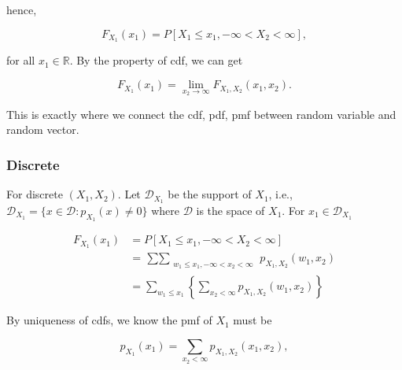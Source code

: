 \documentclass{article}
\begin{document}
            hence,

            \begin{equation*}
                F_{X_{1}}(x_{1}) = P[ X_{1} \leq x_{1}, -\infty < X_{2} < \infty ],
            \end{equation*}

            for all $ x_{1} \in \mathbb{R} $. By the property of cdf, we can get

            \begin{equation*}
                 F_{X_{1}}(x_{1}) = \lim_{x_{2} \rightarrow \infty} F_{X_{1}, X_{2}} (x_{1}, x_{2}).
            \end{equation*}

            This is exactly where we connect the cdf, pdf, pmf between random
            variable and random vector.

            \subsubsection{Discrete}

                For discrete $ (X_{1}, X_{2}) $. Let $ \mathcal{D}_{X_{1}} $ be the support of $ X_{1} $, i.e.,
                $ \mathcal{D}_{X_{1}} = \{ x \in \mathcal{D} : p_{X_{1}}(x) \neq 0 \} $ where $ \mathcal{D} $ is
                the space of $ X_{1} $. For $ x_{1} \in \mathcal{D}_{X_{1}} $

                \begin{align*}
                    F_{X_{1}}(x_{1}) &= P [ X_{1} \leq x_{1}, -\infty < X_{2} < \infty ] \\
                                     &= \mathop{\sum \sum}_{\substack{w_{1} \leq x_{1}, -\infty < x_{2} < \infty }}
                                        p_{X_{1}, X_{2}}(w_{1}, x_{2}) \\
                                     &= \sum_{ w_{1} \leq x_{1}} \left\{ \sum_{ x_{2} < \infty}
                                            p_{X_{1}, X_{2}}(w_{1}, x_{2})
                                        \right\}
                \end{align*}

                By uniqueness of cdfs, we know the pmf of $ X_{1} $ must be

                \begin{equation*}
                     p_{X_{1}}(x_{1}) = \sum_{x_{2} < \infty} p_{X_{1}, X_{2}} (x_{1}, x_{2}),
                \end{equation*}
\end{document}
